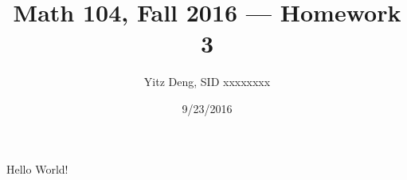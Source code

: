 \documentclass{article}
\title{Math 104, Fall 2016 --- Homework 3}
\author{Yitz Deng, SID xxxxxxxx}
\date{9/23/2016}
\begin{document}
    \maketitle
    Hello World!
\end{document}
